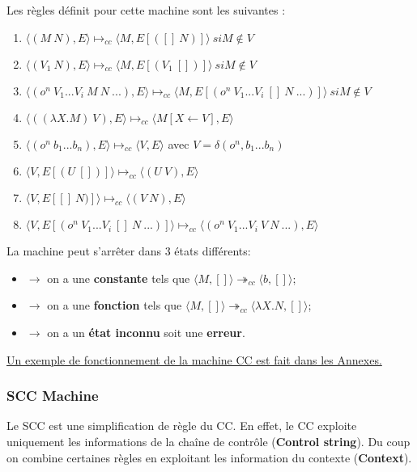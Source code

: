 \documentclass[10pt,a4paper]{article}
\begin{document}
			
			Les règles définit pour cette machine sont les suivantes :
			\begin{enumerate}
				\item $\langle(M~N),E\rangle \longmapsto_{cc} \langle M,E[([]~N)]\rangle~si M \notin V$
				\item $\langle(V_{1}~N),E\rangle \longmapsto_{cc}  \langle M,E[(V_{1}~[])]\rangle~si M \notin V$
				\item $\langle(o^{n}~V_{1}...V_{i}~M~N~...),E\rangle \longmapsto_{cc}  
				\langle M,E[(o^{n}~V_{1}...V_{i}~[]~N~...)]\rangle~ si M \notin V$
				\item $\langle((\lambda X.M)~V),E\rangle \longmapsto_{cc} \langle M[X\longleftarrow V],E\rangle$
				\item $\langle(o^{n}~b_{1}...b_{n}),E\rangle \longmapsto_{cc}  \langle V,E\rangle$ avec $V = \delta(o^{n},b_{1}...b_{n})$ 
				\item $\langle V,E[(U~[])]\rangle \longmapsto_{cc} \langle(U~V),E\rangle$ 
				\item $\langle V,E[[]~N)]\rangle \longmapsto_{cc} \langle(V~N),E\rangle$ 
				\item $\langle V,E[(o^{n}~V_{1}...V_{i}~[]~N~...)]\rangle \longmapsto_{cc} \langle(o^{n}~V_{1}...V_{i}~V~N ~...),E\rangle$ 
			\end{enumerate}
			\bigbreak
			
			
			La machine peut s'arrêter dans 3 états différents:
			\begin{itemize}
				\item[]$\longrightarrow$ on a une \textbf{constante} tels que $\langle M,[]\rangle \twoheadrightarrow_{cc} \langle b,[]\rangle$;
				\item[]$\longrightarrow$ on a une \textbf{fonction} tels que $\langle M,[]\rangle \twoheadrightarrow_{cc} \langle\lambda X.N,[]\rangle$;
				\item[]$\longrightarrow$ on a un \textbf{état inconnu} soit une \textbf{erreur}.
			\end{itemize}
			\smallbreak
			\hyperref[CC]{Un exemple de fonctionnement de la machine CC est fait dans les Annexes.}
			\bigbreak
			
			
			\subsubsection{SCC Machine}
		
			Le SCC est une simplification de règle du CC. En effet, le CC exploite uniquement les informations de la chaîne de contrôle (\textbf{Control string}). Du coup on combine certaines règles en exploitant les information du contexte (\textbf{Context}).
			\bigbreak
			
\end{document}
